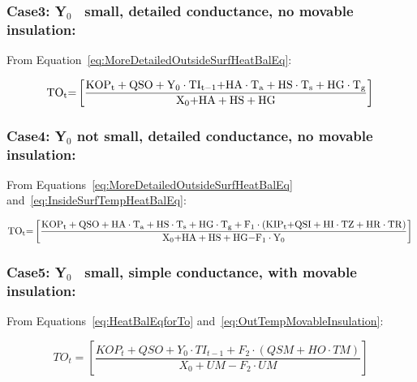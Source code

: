 \subsubsection{Case3: Y\(_{0}\)~ small, detailed conductance, no movable insulation:}\label{case3-yux5f0-small-detailed-conductance-no-movable-insulation}

From Equation~\ref{eq:MoreDetailedOutsideSurfHeatBalEq}:

\begin{equation}
{\rm{T}}{{\rm{O}}_{\rm{t}}}{\rm{ = }}\left[ {\frac{{{\rm{KO}}{{\rm{P}}_{\rm{t}}} + {\rm{QSO}} + {{\rm{Y}}_0}\cdot {\rm{T}}{{\rm{I}}_{{\rm{t - 1}}}}{\rm{ + HA}}\cdot {{\rm{T}}_{\rm{a}}} + {\rm{HS}}\cdot {{\rm{T}}_{\rm{s}}} + {\rm{HG}}\cdot {{\rm{T}}_{\rm{g}}}}}{{{{\rm{X}}_{\rm{0}}}{\rm{ + HA + HS + HG}}}}} \right]{\rm{  }}
\end{equation}

\subsubsection{Case4: Y\(_{0}\) not small, detailed conductance, no movable insulation:}\label{case4-yux5f0-not-small-detailed-conductance-no-movable-insulation}

From Equations~\ref{eq:MoreDetailedOutsideSurfHeatBalEq} and~\ref{eq:InsideSurfTempHeatBalEq}:

\begin{equation}
{\rm{T}}{{\rm{O}}_{\rm{t}}}{\rm{ = }}\left[ {\frac{{{\rm{KO}}{{\rm{P}}_{\rm{t}}} + {\rm{QSO}} + {\rm{HA}}\cdot {{\rm{T}}_{\rm{a}}} + {\rm{HS}}\cdot {{\rm{T}}_{\rm{s}}} + {\rm{HG}}\cdot {{\rm{T}}_{\rm{g}}} + {{\rm{F}}_{\rm{1}}}\cdot \left( {{\rm{KI}}{{\rm{P}}_{\rm{t}}}{\rm{ + QSI + HI}}\cdot {\rm{TZ + HR}}\cdot {\rm{TR}}} \right)}}{{{{\rm{X}}_{\rm{0}}}{\rm{ + HA + HS + HG - }}{{\rm{F}}_1}\cdot {{\rm{Y}}_0}}}} \right]{\rm{  }}
\end{equation}

\subsubsection{Case5: Y\(_{0}\)~ small, simple conductance, with movable insulation:}\label{case5-yux5f0-small-simple-conductance-with-movable-insulation}

From Equations~\ref{eq:HeatBalEqforTo} and~\ref{eq:OutTempMovableInsulation}:

\begin{equation}
TO_t = \left[ \frac{ KOP_t + QSO + Y_0 \cdot {TI_{t-1}} + F_2 \cdot \left( QSM + HO \cdot TM \right) } { X_0 + UM - F_2 \cdot UM } \right]
\label{eq:HeatBalanceEquationCase5}
\end{equation}

